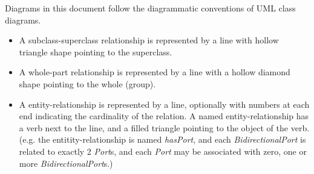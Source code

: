 Diagrams in this document follow the diagrammatic conventions of UML class diagrams.
\begin{itemize}
\item A subclass-superclass relationship is represented by a line with hollow triangle shape pointing to the superclass.
\item A whole-part relationship is represented by a line with a hollow diamond shape pointing to the whole (group).
\item A entity-relationship is represented by a line, optionally with numbers at each end indicating the cardinality of the relation. A named entity-relationship has a verb next to the line, and a filled triangle pointing to the object of the verb. (e.g. the entitity-relationship
 is named \emph{hasPort}, and each \emph{BidirectionalPort} is related to exactly 2 \emph{Port}s, and each \emph{Port} may be associated with zero, one or more \emph{BidirectionalPort}s.)
\end{itemize}

